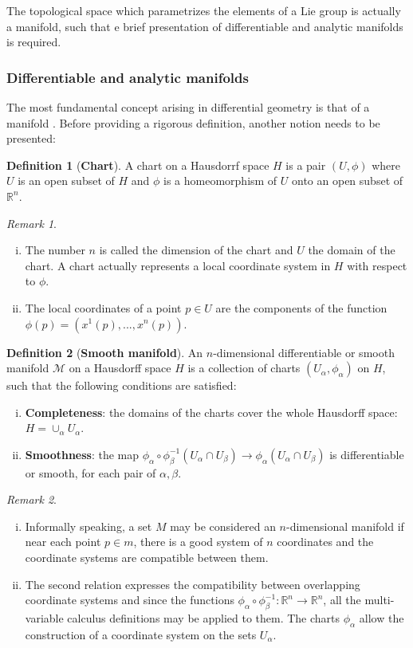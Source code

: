 \documentclass[12pt,a4paper]{report}
\theoremstyle{definition}
\newtheorem{definition}{Definition}
\theoremstyle{remark}
\newtheorem*{remark}{Remark}
\theoremstyle{remark}
\begin{document}
The topological space which parametrizes the elements of a Lie group is actually a manifold, such that e brief presentation of differentiable and analytic manifolds is required.

\subsubsection{Differentiable and analytic manifolds}
The most fundamental concept arising in differential geometry is that of a manifold \cite{singermech}. Before providing a rigorous definition, another notion needs to be presented:
\begin{definition} [\textbf{Chart}]
A chart on a Hausdorrf space $H$ is a pair $(U,\phi)$ where $U$ is an open subset of $H$ and $\phi$ is a homeomorphism of $U$ onto an open subset of $\mathbb{R}^n$.
\end{definition}
\begin{remark}\mbox{}
\begin{enumerate}[i.]
\item The number $n$ is called the dimension of the chart and $U$ the domain of the chart. A chart actually represents a local coordinate system in $H$ with respect to $\phi$.
\item The local coordinates of a point $p\in U$ are the components of the function $\phi(p)=(x^1(p),...,x^n(p))$.
\end{enumerate} 
\end{remark}
\begin{definition}[\textbf{Smooth manifold}]
An $n$-dimensional differentiable or smooth manifold $\mathcal{M}$ on a Hausdorff space $H$ is a collection of charts $(U_\alpha,\phi_\alpha)$ on $H$, such that the following conditions are satisfied:
\begin{enumerate}[i.]
\item \textbf{Completeness}: the domains of the charts cover the whole Hausdorff space: $H=\cup_\alpha U_\alpha$.
\item \textbf{Smoothness}: the map $\phi_\alpha\circ \phi_\beta^{-1}(U_\alpha\cap U_\beta)\rightarrow\phi_\alpha(U_\alpha\cap U_\beta)$ is differentiable or smooth, for each pair of $\alpha,\beta$.
\end{enumerate}
\end{definition}
\begin{remark}\mbox{}
\begin{enumerate}[i.]
\item Informally speaking, a set $M$ may be considered an $n$-dimensional manifold if near each point $p\in m$, there is a good system of $n$ coordinates and the coordinate systems are compatible between them. 
\item The second relation expresses the compatibility between overlapping coordinate systems and since the functions  $\phi_\alpha\circ \phi_\beta^{-1}:\mathbb{R}^n\rightarrow\mathbb{R}^n$, all the multi-variable calculus definitions may be applied to them. The charts $\phi_\alpha$ allow the construction of a coordinate system on the sets $U_\alpha$.
\end{enumerate}
\end{remark}
\end{document}
